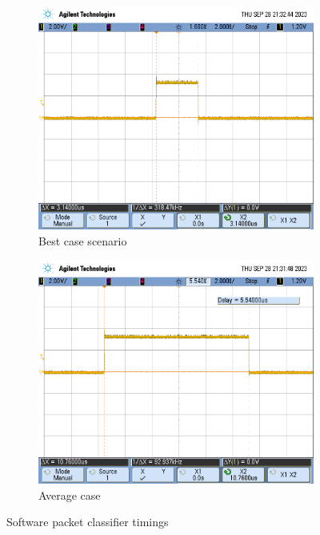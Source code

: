 \begin{figure}[h]
    \centering
    \begin{subfigure}[b]{0.45\textwidth} %
        \includegraphics[width=\textwidth]{Images/sw_pf_best_case.png}
        \caption{Best case scenario}
        \label{fig:sw_pf_best_case}
    \end{subfigure}
    \hfill %
    \begin{subfigure}[b]{0.45\textwidth} %
        \includegraphics[width=\textwidth]{Images/sw_pf_bad_case.png}
        \caption{Average case}
        \label{fig:sw_pf_bad_case}
    \end{subfigure}
    \caption{Software packet classifier timings}
    \label{fig:sw_pf_timings}
\end{figure}

